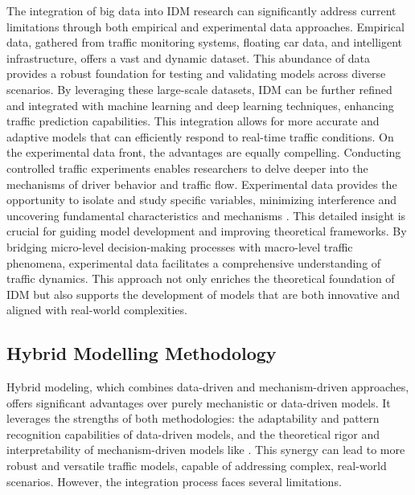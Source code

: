 \documentclass[a4paper,fleqn]{cas-sc}
\begin{document}
The integration of big data into IDM research can significantly address current limitations through both empirical and experimental data approaches. Empirical data, gathered from traffic monitoring systems, floating car data, and intelligent infrastructure, offers a vast and dynamic dataset. This abundance of data provides a robust foundation for testing and validating models across diverse scenarios. By leveraging these large-scale datasets, IDM can be further refined and integrated with machine learning and deep learning techniques, enhancing traffic prediction capabilities. This integration allows for more accurate and adaptive models that can efficiently respond to real-time traffic conditions. On the experimental data front, the advantages are equally compelling. Conducting controlled traffic experiments enables researchers to delve deeper into the mechanisms of driver behavior and traffic flow. Experimental data provides the opportunity to isolate and study specific variables, minimizing interference and uncovering fundamental characteristics and mechanisms \citep{tianCarFollowingDynamicsExperiments2023}. This detailed insight is crucial for guiding model development and improving theoretical frameworks. By bridging micro-level decision-making processes with macro-level traffic phenomena, experimental data facilitates a comprehensive understanding of traffic dynamics. This approach not only enriches the theoretical foundation of IDM but also supports the development of models that are both innovative and aligned with real-world complexities.

\subsection{Hybrid Modelling Methodology}

Hybrid modeling, which combines data-driven and mechanism-driven approaches, offers significant advantages over purely mechanistic or data-driven models. It leverages the strengths of both methodologies: the adaptability and pattern recognition capabilities of data-driven models, and the theoretical rigor and interpretability of mechanism-driven models like \citep{yuanMacroscopicTrafficFlowModeling2021,yuanModelingStochasticMicroscopicTraffic2020}. This synergy can lead to more robust and versatile traffic models, capable of addressing complex, real-world scenarios. However, the integration process faces several limitations.
\end{document}
